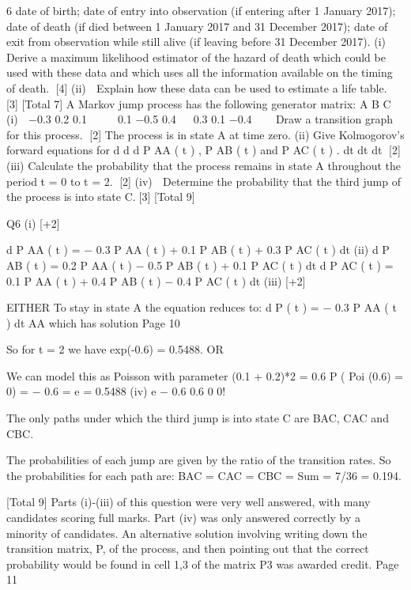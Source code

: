 \documentclass[a4paper,12pt]{article}
\begin{document}
6
date of birth;
date of entry into observation (if entering after 1 January 2017);
date of death (if died between 1 January 2017 and 31 December 2017);
date of exit from observation while still alive (if leaving before 31 December
2017).
(i) Derive a maximum likelihood estimator of the hazard of death which could be
used with these data and which uses all the information available on the timing
of death.
[4]
(ii)
 Explain how these data can be used to estimate a life table.
[3]
[Total 7]
A Markov jump process has the following generator matrix:
A
B
C
(i)
⎛ −0.3 0.2 0.1 ⎞
⎟
⎜
⎜ 0.1 −0.5 0.4 ⎟
⎜ 0.3 0.1 −0.4 ⎟
⎠
⎝
Draw a transition graph for this process.
[2]
The process is in state A at time zero.
(ii)
Give Kolmogorov’s forward equations for
d
d
d
P AA ( t ) ,
P AB ( t ) and
P AC ( t ) .
dt
dt
dt
[2]
(iii) Calculate the probability that the process remains in state A throughout the
period t = 0 to t = 2.
[2]
(iv)
 Determine the probability that the third jump of the process is into state C.[3]
[Total 9]


Q6
(i)
[+2]

d
P AA ( t ) =
− 0.3 P AA ( t ) + 0.1 P AB ( t ) + 0.3 P AC ( t )
dt
(ii)
d
P AB ( t ) = 0.2 P AA ( t ) − 0.5 P AB ( t ) + 0.1 P AC ( t )
dt
d
P AC ( t ) = 0.1 P AA ( t ) + 0.4 P AB ( t ) − 0.4 P AC ( t )
dt
(iii)
[+2]

EITHER
To stay in state A the equation reduces to:
d
P ( t ) = − 0.3 P AA ( t )
dt AA
which has solution
Page 10



So for t = 2 we have exp(-0.6) = 0.5488.
OR

We can model this as Poisson with parameter (0.1 + 0.2)*2 = 0.6
P ( Poi (0.6)
= 0)
=
− 0.6
= e =
0.5488
(iv)
e − 0.6 0.6 0
0!



The only paths under which the third jump is into state C are BAC, CAC
and CBC.

The probabilities of each jump are given by the ratio of the transition rates.
So the probabilities for each path are:
BAC = 
CAC = 
CBC = 
Sum = 7/36 = 0.194.


[Total 9]
Parts (i)-(iii) of this question were very well answered, with many
candidates scoring full marks. Part (iv) was only answered
correctly by a minority of candidates. An alternative solution
involving writing down the transition matrix, P, of the process, and
then pointing out that the correct probability would be found in
cell {1,3} of the matrix P3 was awarded credit.
Page 11
\end{document}
